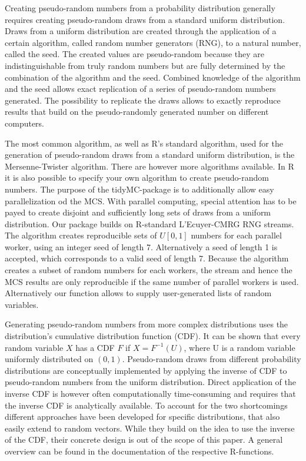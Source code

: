 \documentclass[10pt,a4paper]{article}
\begin{document}
 Creating pseudo-random numbers from a probability distribution
 generally requires creating pseudo-random draws from a standard uniform
 distribution. Draws from a uniform distribution are created through the
 application of a certain algorithm, called random number generators
 (RNG), to a natural number, called the seed. The created values are
 pseudo-random because they are indistinguishable from truly random
 numbers but are fully determined by the combination of the algorithm
 and the seed. Combined knowledge of the algorithm and the seed allows
 exact replication of a series of pseudo-random numbers generated. The
 possibility to replicate the draws allows to exactly reproduce results
 that build on the pseudo-randomly generated number on different
 computers.

 The most common algorithm, as well as R's standard algorithm, used for
 the generation of pseudo-random draws from a standard uniform
 distribution, is the Mersenne-Twister algorithm. There are however more
 algorithms available. In R it is also possible to specify your own
 algorithm to create pseudo-random numbers. The purpose of the
 tidyMC-package is to additionally allow easy parallelization od the
 MCS. With parallel computing, special attention has to be payed to
 create disjoint and sufficiently long sets of draws from a uniform
 distribution. Our package builds on R-standard L'Ecuyer-CMRG RNG
 streams. The algorithm creates reproducible sets of \(U[0,1]\) numbers
 for each parallel worker, using an integer seed of length 7.
 Alternatively a seed of length 1 is accepted, which corresponds to a
 valid seed of length 7. Because the algorithm creates a subset of
 random numbers for each workers, the stream and hence the MCS results
 are only reproducible if the same number of parallel workers is used.
 Alternatively our function allows to supply user-generated lists of
 random variables.

 Generating pseudo-random numbers from more complex distributions uses
 the distribution's cumulative distribution function (CDF). It can be
 shown that every random variable \(X\) has a CDF \(F\) if
 \(X = F^{-1}(U)\), where U is a random variable uniformly distributed
 on \((0,1)\). Pseudo-random draws from different probability
 distributions are conceptually implemented by applying the inverse of
 CDF to pseudo-random numbers from the uniform distribution. Direct
 application of the inverse CDF is however often computationally
 time-consuming and requires that the inverse CDF is analytically
 available. To account for the two shortcomings different approaches
 have been developed for specific distributions, that also easily extend
 to random vectors. While they build on the idea to use the inverse of
 the CDF, their concrete design is out of the scope of this paper. A
 general overview can be found in the documentation of the respective
 R-functions.
\end{document}
